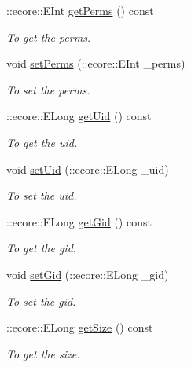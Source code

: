 \begin{DoxyCompactItemize}
::ecore::EInt \hyperlink{classFMS__Data_1_1FileStat_af3da03a5e439217204b3b29bd063cbbb}{getPerms} () const 
\begin{DoxyCompactList}\small\item\em To get the perms. \item\end{DoxyCompactList}\item 
void \hyperlink{classFMS__Data_1_1FileStat_a49c26a3faa1b80645a99ca22a807ef19}{setPerms} (::ecore::EInt \_\-perms)
\begin{DoxyCompactList}\small\item\em To set the perms. \item\end{DoxyCompactList}\item 
::ecore::ELong \hyperlink{classFMS__Data_1_1FileStat_a31414d9cc8517232a7889f4233d86b6e}{getUid} () const 
\begin{DoxyCompactList}\small\item\em To get the uid. \item\end{DoxyCompactList}\item 
void \hyperlink{classFMS__Data_1_1FileStat_a0b3da80279d08d0ff87b2b278593b57e}{setUid} (::ecore::ELong \_\-uid)
\begin{DoxyCompactList}\small\item\em To set the uid. \item\end{DoxyCompactList}\item 
::ecore::ELong \hyperlink{classFMS__Data_1_1FileStat_abf49cbe414388a04a41d8dc8b237be46}{getGid} () const 
\begin{DoxyCompactList}\small\item\em To get the gid. \item\end{DoxyCompactList}\item 
void \hyperlink{classFMS__Data_1_1FileStat_a8ced754acee4c5c51612f676f541b219}{setGid} (::ecore::ELong \_\-gid)
\begin{DoxyCompactList}\small\item\em To set the gid. \item\end{DoxyCompactList}\item 
::ecore::ELong \hyperlink{classFMS__Data_1_1FileStat_a85c47479013c38493ed6c0234f874231}{getSize} () const 
\begin{DoxyCompactList}\small\item\em To get the size. \item\end{DoxyCompactList}\item 

\end{DoxyCompactItemize}
